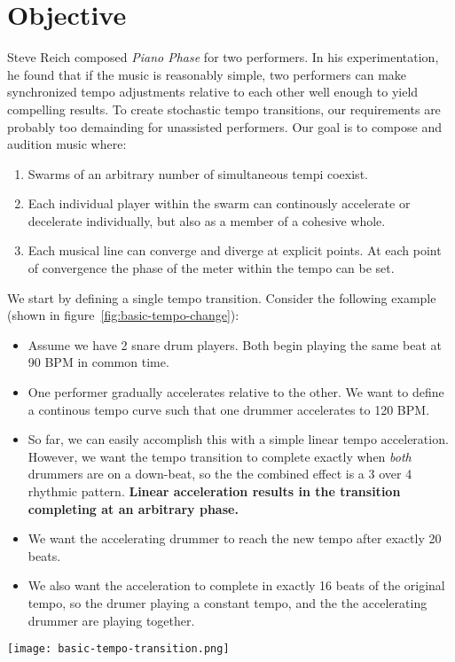 \section{Objective}
\label{sec:polytempic-objective}
Steve Reich composed \textit{Piano Phase} for two performers. In his
experimentation, he found that if the music is reasonably simple, two
performers can make synchronized tempo adjustments relative to each
other well enough to yield compelling results. To create stochastic
tempo transitions, our requirements are probably too demainding for
unassisted performers. Our goal is to compose and audition music
where:
\begin{enumerate}
  \item Swarms of an arbitrary number of simultaneous tempi
    coexist. 
  \item Each individual player within the swarm can continously
    accelerate or decelerate individually, but also as a member of a
    cohesive whole. 
  \item Each musical line can converge and diverge at explicit
    points. At each point of convergence the phase of the meter within
    the tempo can be set.
\end{enumerate}
We start by defining a single tempo transition. Consider the following
example (shown in figure~\ref{fig:basic-tempo-change}):
\begin{itemize}
\item Assume we have 2 snare drum players. Both begin playing the same
  beat at 90 BPM in common time.
\item One performer gradually accelerates relative to the other. We want
  to define a continous tempo curve such that one drummer accelerates
  to 120 BPM.
\item So far, we can easily accomplish this with a simple linear tempo
  acceleration. However, we want the tempo transition to complete
  exactly when \emph{both} drummers are on a down-beat, so the the
  combined effect is a 3 over 4 rhythmic pattern. \textbf{Linear
    acceleration results in the transition completing at an arbitrary
    phase.}
\item We want the accelerating drummer to reach the new tempo after
  exactly 20 beats.
\item We also want the acceleration to complete in exactly 16 beats of
  the original tempo, so the drumer playing a constant tempo, and the
  the accelerating drummer are playing together.
\end{itemize}
\begin{figure*}[h]
  \texttt{[image: basic-tempo-transition.png]}
  \caption[Tempo Transition]{Tempo Transition from 90~BPM
    to 120~BPM}
  \label{fig:basic-tempo-change}
\end{figure*}


